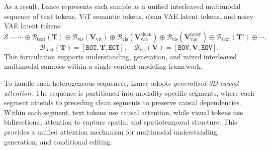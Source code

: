 \documentclass{llmxive}
\begin{document}
As a result, Lance represents each sample as a unified interleaved multimodal sequence of text tokens, ViT semantic tokens, clean VAE latent tokens, and noisy VAE latent tokens:
\begin{equation}
\mathcal{S}
=
\cdots \oplus
\mathcal{B}_{\mathrm{text}}(\mathbf{T})
\oplus
\mathcal{B}_{\mathrm{vis}}(\mathbf{V}_{\mathrm{vit}})
\oplus
\mathcal{B}_{\mathrm{vis}}(\mathbf{V}_{\mathrm{vae}}^{\mathrm{clean}})
\oplus
\mathcal{B}_{\mathrm{vis}}(\mathbf{V}_{\mathrm{vae}}^{\mathrm{noisy}})
\oplus
\mathcal{B}_{\mathrm{text}}(\mathbf{T}')
\oplus \cdots ,
\end{equation}
\begin{equation}
\mathcal{B}_{\mathrm{text}}(\mathbf{T})
=
[\texttt{BOT}, \mathbf{T}, \texttt{EOT}],
\quad
\mathcal{B}_{\mathrm{vis}}(\mathbf{V})
=
[\texttt{BOV}, \mathbf{V}, \texttt{EOV}].
\end{equation}
This formulation supports understanding, generation, and mixed interleaved multimodal samples within a single context modeling framework.


To handle such heterogeneous sequences, Lance adopts \textit{generalized 3D causal attention}. The sequence is partitioned into modality-specific segments, where each segment attends to preceding clean segments to preserve causal dependencies. Within each segment, text tokens use causal attention, while visual tokens use bidirectional attention to capture spatial and spatiotemporal structure. This provides a unified attention mechanism for multimodal understanding, generation, and conditional editing.
\end{document}
